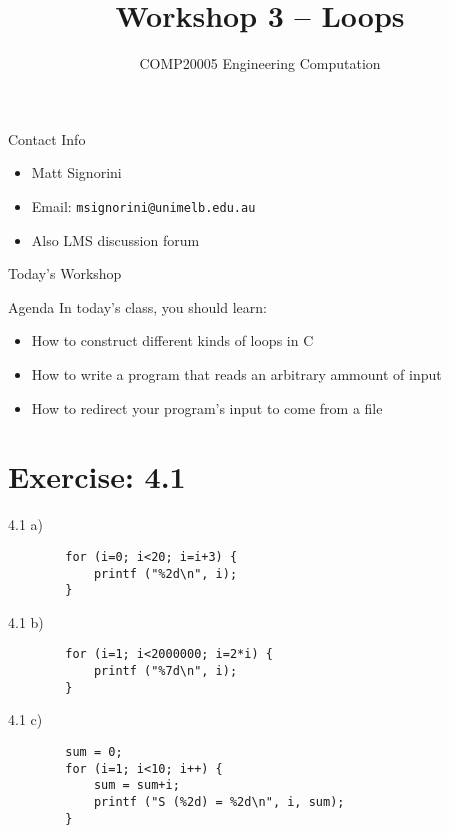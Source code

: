 \documentclass{beamer}
\title{Workshop 3 -- Loops}
\author{COMP20005 Engineering Computation}
\institute{The University of Melbourne}
\begin{document}
\begin{frame}
    \titlepage
\end{frame}

\begin{frame}{Contact Info}
    \begin{itemize}
        \item Matt Signorini
        \item Email: \texttt{msignorini@unimelb.edu.au}
        \item Also LMS discussion forum
    \end{itemize}
\end{frame}

\begin{frame}{Today's Workshop}
    \begin{block}{Agenda}
        In today's class, you should learn:
        \begin{itemize}
            \item How to construct different kinds of loops in C
            \item How to write a program that reads an arbitrary ammount
                of input
            \item How to redirect your program's input to come from a
                file
        \end{itemize}
    \end{block}
\end{frame}

\section{Exercise: 4.1}

\begin{frame}[fragile]{4.1 a)}
    \begin{verbatim}
        for (i=0; i<20; i=i+3) {
            printf ("%2d\n", i);
        }
    \end{verbatim}
\end{frame}

\begin{frame}[fragile]{4.1 b)}
    \begin{verbatim}
        for (i=1; i<2000000; i=2*i) {
            printf ("%7d\n", i);
        }
    \end{verbatim}
\end{frame}

\begin{frame}[fragile]{4.1 c)}
    \begin{verbatim}
        sum = 0;
        for (i=1; i<10; i++) {
            sum = sum+i;
            printf ("S (%2d) = %2d\n", i, sum);
        }
    \end{verbatim}
\end{frame}
\end{document}
